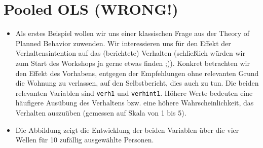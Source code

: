 \documentclass[
]{book}
\newenvironment{Shaded}{\begin{snugshade}}{\end{snugshade}}
\newcommand{\DataTypeTok}[1]{\textcolor[rgb]{0.13,0.29,0.53}{#1}}
\newcommand{\DecValTok}[1]{\textcolor[rgb]{0.00,0.00,0.81}{#1}}
\newcommand{\FloatTok}[1]{\textcolor[rgb]{0.00,0.00,0.81}{#1}}
\newcommand{\KeywordTok}[1]{\textcolor[rgb]{0.13,0.29,0.53}{\textbf{#1}}}
\newcommand{\NormalTok}[1]{#1}
\newcommand{\OperatorTok}[1]{\textcolor[rgb]{0.81,0.36,0.00}{\textbf{#1}}}
\newcommand{\OtherTok}[1]{\textcolor[rgb]{0.56,0.35,0.01}{#1}}
\newcommand{\StringTok}[1]{\textcolor[rgb]{0.31,0.60,0.02}{#1}}
\providecommand{\tightlist}{%
  \setlength{\itemsep}{0pt}\setlength{\parskip}{0pt}}
\begin{document}
\hypertarget{pooled-ols-wrong}{%
\section{Pooled OLS (WRONG!)}\label{pooled-ols-wrong}}

\begin{itemize}
\tightlist
\item
  Als erstes Beispiel wollen wir uns einer klassischen Frage aus der Theory of Planned Behavior zuwenden. Wir interessieren uns für den Effekt der Verhaltensintention auf das (berichtete) Verhalten (schließlich würden wir zum Start des Workshops ja gerne etwas finden ;)). Konkret betrachten wir den Effekt des Vorhabens, entgegen der Empfehlungen ohne relevanten Grund die Wohnung zu verlassen, auf den Selbstbericht, dies auch zu tun. Die beiden relevanten Variablen sind \texttt{verh1} und \texttt{verhint1}. Höhere Werte bedeuten eine häufigere Ausübung des Verhaltens bzw. eine höhere Wahrscheinlichkeit, das Verhalten auszuüben (gemessen auf Skala von 1 bis 5).
\item
  Die Abbildung zeigt die Entwicklung der beiden Variablen über die vier Wellen für 10 zufällig ausgewählte Personen.
\end{itemize}

\begin{Shaded}
\end{Shaded}
\end{document}
